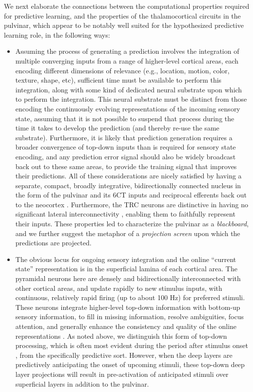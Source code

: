 \documentclass[11pt,twoside]{article}
\newif\myifpdf
\begin{document}
We next elaborate the connections between the computational properties required for predictive learning, and the properties of the thalamocortical circuits in the pulvinar, which appear to be notably well suited for the hypothesized predictive learning role, in the following ways:
\begin{itemize}

	\item Assuming the process of generating a prediction involves the integration of multiple converging inputs from a range of higher-level cortical areas, each encoding different dimensions of relevance (e.g., location, motion, color, texture, shape, etc), sufficient time must be available to perform this integration, along with some kind of dedicated neural substrate upon which to perform the integration.  This neural substrate must be distinct from those encoding the continuously evolving representations of the incoming sensory state, assuming that it is not possible to suspend that process during the time it takes to develop the prediction (and thereby re-use the same substrate).  Furthermore, it is likely that prediction generation requires a broader convergence of top-down inputs than is required for sensory state encoding, and any prediction error signal should also be widely broadcast back out to these same areas, to provide the training signal that improves their predictions.  All of these considerations are nicely satisfied by having a separate, compact, broadly integrative, bidirectionally connected nucleus in the form of the pulvinar and its 6CT inputs and reciprocal efferents back out to the neocortex \citep{Shipp03}.  Furthermore, the TRC neurons are distinctive in having no significant lateral interconnectivity \citep{ShermanGuillery06}, enabling them to faithfully represent their inputs.  These properties led \citet{Mumford91} to characterize the pulvinar as a \emph{blackboard}, and we further suggest the metaphor of a \emph{projection screen} upon which the predictions are projected.

	\item The obvious locus for ongoing sensory integration and the online ``current state'' representation is in the superficial lamina of each cortical area.  The pyramidal neurons here are densely and bidirectionally interconnected with other cortical areas, and update rapidly to new stimulus inputs, with continuous, relatively rapid firing (up to about 100 Hz) for preferred stimuli.  These neurons integrate higher-level top-down information with bottom-up sensory information, to fill in missing information, resolve ambiguities, focus attention, and generally enhance the consistency and quality of the online representations \citep{DesimoneDuncan95,ReynoldsChelazziDesimone99,MillerCohen01,OReillyWyatteHerdEtAl13,OReillyMunakataFrankEtAl12,OReillyHazyHerd16}. As noted above, we distinguish this form of top-down processing, which is often most evident during the period after stimulus onset \citep{LeeMumford03}, from the specifically predictive sort.  However, when the deep layers are predictively anticipating the onset of upcoming stimuli, these top-down deep layer projections will result in pre-activation of anticipated stimuli over superficial layers in addition to the pulvinar.


\end{itemize}
\end{document}
